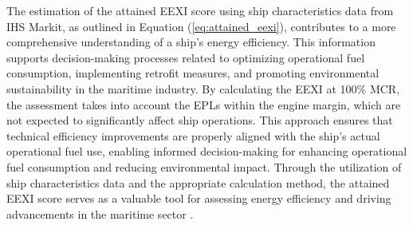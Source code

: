 The estimation of the attained EEXI score using ship characteristics data from IHS Markit, as outlined in Equation (\ref{eq:attained_eexi}), contributes to a more comprehensive understanding of a ship's energy efficiency.
This information supports decision-making processes related to optimizing operational fuel consumption, implementing retrofit measures, and promoting environmental sustainability in the maritime industry.
By calculating the EEXI at 100\% MCR, the assessment takes into account the EPLs within the engine margin, which are not expected to significantly affect ship operations.
This approach ensures that technical efficiency improvements are properly aligned with the ship's actual operational fuel use, enabling informed decision-making for enhancing operational fuel consumption and reducing environmental impact.
Through the utilization of ship characteristics data and the appropriate calculation method, the attained EEXI score serves as a valuable tool for assessing energy efficiency and driving advancements in the maritime sector \autocite{rutherford2020potential}.




